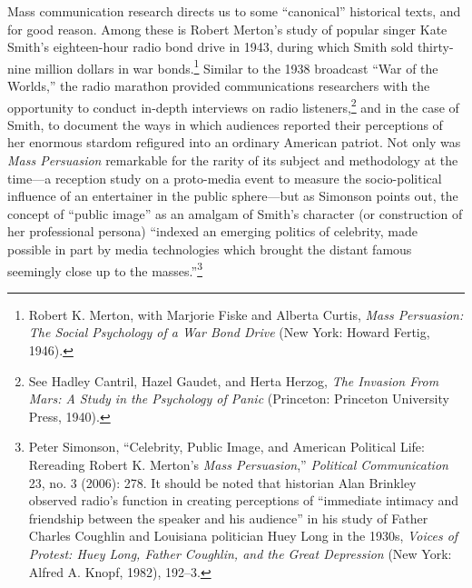 \documentclass{tufte-handout}
\begin{document}
Mass communication research directs us to some ``canonical'' historical
texts, and for good reason. Among these is Robert Merton's study of
popular singer Kate Smith's eighteen-hour radio bond drive in 1943,
during which Smith sold thirty-nine million dollars in war
bonds.\footnote{Robert K. Merton, with Marjorie Fiske and Alberta
  Curtis, \emph{Mass Persuasion: The Social Psychology of a War Bond
  Drive} (New York: Howard Fertig, 1946).} Similar to the 1938 broadcast
``War of the Worlds,'' the radio marathon provided communications
researchers with the opportunity to conduct in-depth interviews on radio
listeners,\footnote{See Hadley Cantril, Hazel Gaudet, and Herta Herzog,
  \emph{The Invasion From Mars: A Study in the Psychology of Panic}
  (Princeton: Princeton University Press, 1940).} and in the case of
Smith, to document the ways in which audiences reported their
perceptions of her enormous stardom refigured into an ordinary American
patriot. Not only was \emph{Mass Persuasion} remarkable for the rarity
of its subject and methodology at the time---a reception study on a
proto-media event to measure the socio-political influence of an
entertainer in the public sphere---but as Simonson points out, the
concept of ``public image'' as an amalgam of Smith's character (or
construction of her professional persona) ``indexed an emerging politics
of celebrity, made possible in part by media technologies which brought
the distant famous seemingly close up to the masses.''\footnote{Peter
  Simonson, ``Celebrity, Public Image, and American Political Life:
  Rereading Robert K. Merton's \emph{Mass Persuasion},'' \emph{Political
  Communication} 23, no. 3 (2006): 278. It should be noted that
  historian Alan Brinkley observed radio's function in creating
  perceptions of ``immediate intimacy and friendship between the speaker
  and his audience'' in his study of Father Charles Coughlin and
  Louisiana politician Huey Long in the 1930s, \emph{Voices of Protest:
  Huey Long, Father Coughlin, and the Great Depression} (New York:
  Alfred A. Knopf, 1982), 192--3.}
\end{document}
